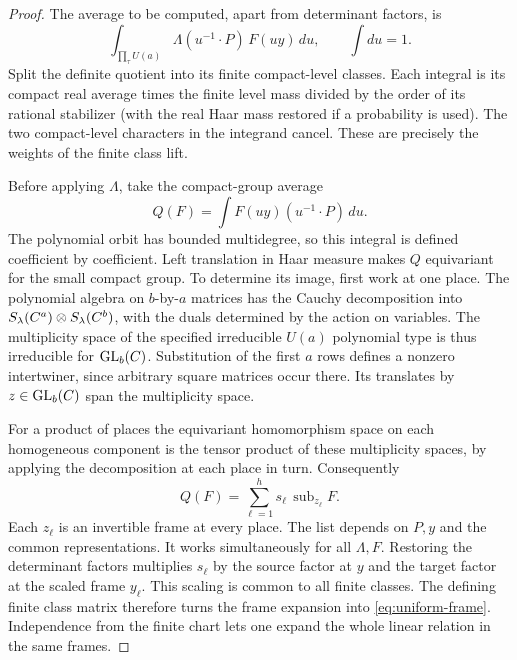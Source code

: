 \begin{proof}
The average to be computed, apart from determinant factors, is
\[
 \int_{\prod_\tau U(a)}
  \Lambda(u^{-1}\cdot P)\,F(uy)\,du ,
 \qquad \int du=1.
\]
Split the definite quotient into its finite compact-level classes.
Each integral is its compact real average times the finite level
mass divided by the order of its rational stabilizer (with the
real Haar mass restored if a probability is used).
The two compact-level characters in the integrand cancel.
These are precisely the weights of the finite class lift.

Before applying \(\Lambda\), take the compact-group average
\[
 Q(F)=\int F(uy)(u^{-1}\cdot P)\,du .
\]
The polynomial orbit has bounded multidegree, so this integral
is defined coefficient by coefficient. Left translation in Haar
measure makes \(Q\) equivariant for the small compact group.
To determine its image, first
work at one place. The polynomial algebra on \(b\)-by-\(a\)
matrices has the Cauchy decomposition into
\(S_\lambda(C^a)\otimes S_\lambda(C^b)\), with the duals
determined by the action on variables. The multiplicity space
of the specified irreducible \(U(a)\) polynomial type is thus
irreducible for \(\mathrm{GL}_b(C)\). Substitution of the first
\(a\) rows defines a nonzero intertwiner, since arbitrary square
matrices occur there. Its translates by
\(z\in\mathrm{GL}_b(C)\) span the multiplicity space.

For a product of places the equivariant homomorphism space on
each homogeneous component is the tensor product of these
multiplicity spaces, by applying the decomposition at each
place in turn. Consequently
\[
 Q(F)=\sum_{\ell=1}^h s_\ell\,\operatorname{sub}_{z_\ell}F .
\]
Each \(z_\ell\) is an invertible frame at every place. The list
depends on \(P,y\) and the common representations. It works
simultaneously for all \(\Lambda,F\). Restoring the determinant
factors multiplies \(s_\ell\) by the source factor at \(y\) and
the target factor at the scaled frame \(y_\ell\). This scaling is
common to all finite classes. The defining finite class matrix
therefore turns the frame expansion into \eqref{eq:uniform-frame}.
Independence from the finite chart lets one expand the whole linear relation in the same frames.


\end{proof}
